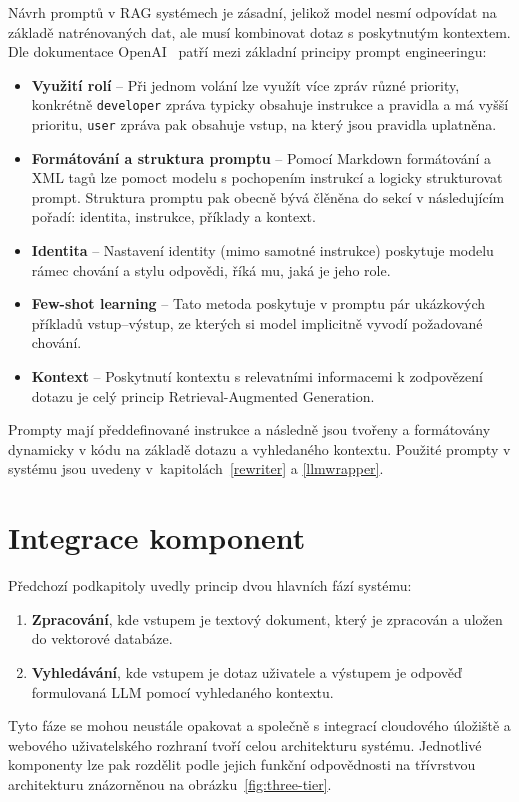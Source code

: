 Návrh promptů v RAG systémech je zásadní, jelikož model nesmí odpovídat na základě natrénovaných dat, ale musí kombinovat dotaz s poskytnutým kontextem. Dle dokumentace OpenAI~\cite{openaidocs} patří mezi základní principy prompt engineeringu:
\begin{itemize}
    \item \textbf{Využití rolí} – Při jednom volání lze využít více zpráv různé priority, konkrétně \texttt{developer} zpráva typicky obsahuje instrukce a pravidla a má vyšší prioritu, \texttt{user} zpráva pak obsahuje vstup, na který jsou pravidla uplatněna.
    
    \item \textbf{Formátování a struktura promptu} – Pomocí Markdown formátování a XML tagů lze pomoct modelu s pochopením instrukcí a logicky strukturovat prompt. Struktura promptu pak obecně bývá člěněna do sekcí v následujícím pořadí: identita, instrukce, příklady a kontext.
    
    \item \textbf{Identita} – Nastavení identity (mimo samotné instrukce) poskytuje modelu rámec chování a stylu odpovědi, říká mu, jaká je jeho role.

    \item \textbf{Few-shot learning} – Tato metoda poskytuje v promptu pár ukázkových příkladů vstup–výstup, ze kterých si model implicitně vyvodí požadované chování. 

    \item \textbf{Kontext} – Poskytnutí kontextu s relevatními informacemi k zodpovězení dotazu je celý princip Retrieval-Augmented Generation.
\end{itemize}

Prompty mají předdefinované instrukce a následně jsou tvořeny a formátovány dynamicky v kódu na základě dotazu a vyhledaného kontextu. Použité prompty v systému jsou uvedeny v~kapitolách~\ref{rewriter} a \ref{llmwrapper}.

\section{Integrace komponent}
Předchozí podkapitoly uvedly princip dvou hlavních fází systému:
\begin{enumerate}
    \item \textbf{Zpracování}, kde vstupem je textový dokument, který je zpracován a uložen do vektorové databáze.
    \item \textbf{Vyhledávání}, kde vstupem je dotaz uživatele a výstupem je odpověď formulovaná LLM pomocí vyhledaného kontextu.
\end{enumerate}
Tyto fáze se mohou neustále opakovat a společně s integrací cloudového úložiště a webového uživatelského rozhraní tvoří celou architekturu systému. Jednotlivé komponenty lze pak rozdělit podle jejich funkční odpovědnosti na třívrstvou architekturu znázorněnou na obrázku~\ref{fig:three-tier}.


